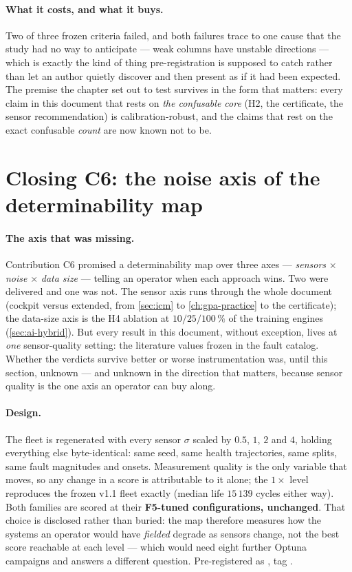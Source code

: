 \paragraph{What it costs, and what it buys.} Two of three frozen criteria failed, and both
failures trace to one cause that the study had no way to anticipate --- weak columns have
unstable directions --- which is exactly the kind of thing pre-registration is supposed to
catch rather than let an author quietly discover and then present as if it had been expected.
The premise the chapter set out to test survives in the form that matters: every claim in this
document that rests on \emph{the confusable core} (H2, the certificate, the sensor
recommendation) is calibration-robust, and the claims that rest on the exact confusable
\emph{count} are now known not to be.

\section{Closing C6: the noise axis of the determinability map}
\label{sec:noise-sweep}

\paragraph{The axis that was missing.} Contribution C6 promised a determinability map over
three axes --- \emph{sensors} $\times$ \emph{noise} $\times$ \emph{data size} --- telling an
operator when each approach wins. Two were delivered and one was not. The sensor axis runs
through the whole document (cockpit versus extended, from \cref{sec:icm} to
\cref{ch:gpa-practice} to the certificate); the data-size axis is the H4 ablation at
$10/25/100\,\%$ of the training engines (\cref{sec:ai-hybrid}). But every result in this
document, without exception, lives at \emph{one} sensor-quality setting: the literature
values frozen in the fault catalog. Whether the verdicts survive better or worse
instrumentation was, until this section, unknown --- and unknown in the direction that
matters, because sensor quality is the one axis an operator can buy along.

\paragraph{Design.} The fleet is regenerated with every sensor $\sigma$ scaled by
$0.5$, $1$, $2$ and $4$, holding everything else byte-identical: same seed, same health
trajectories, same splits, same fault magnitudes and onsets. Measurement quality is the only
variable that moves, so any change in a score is attributable to it alone; the $1\times$ level
reproduces the frozen v1.1 fleet exactly (median life $15\,139$ cycles either way). Both
families are scored at their \textbf{F5-tuned configurations, unchanged}. That choice is
disclosed rather than buried: the map therefore measures how the systems an operator would
have \emph{fielded} degrade as sensors change, not the best score reachable at each level ---
which would need eight further Optuna campaigns and answers a different question.
Pre-registered as , tag .

